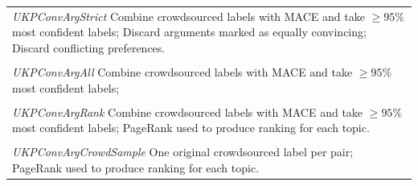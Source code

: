 \begin{table}
  \begin{tabularx}{\columnwidth}{ X }
  \emph{UKPConvArgStrict} \newline 
  Combine crowdsourced labels with MACE and take $\ge 95\%$ most confident labels; \newline
  Discard arguments marked as equally convincing; \newline
  Discard conflicting preferences.
  \\\hrulefill \\
  \emph{UKPConvArgAll} \newline
  Combine crowdsourced labels with MACE and take $\ge 95\%$ most confident labels; 
  \\\hrulefill \\      
  \emph{UKPConvArgRank} \newline
  Combine crowdsourced labels with MACE and take $\ge 95\%$ most confident labels;  \newline
  PageRank used to produce ranking for each topic.
  \\\hrulefill \\  
  \emph{UKPConvArgCrowdSample} \newline
  One original crowdsourced label per pair;\newline
  PageRank used to produce ranking for each topic. 
  

\end{tabularx}
\end{table}
